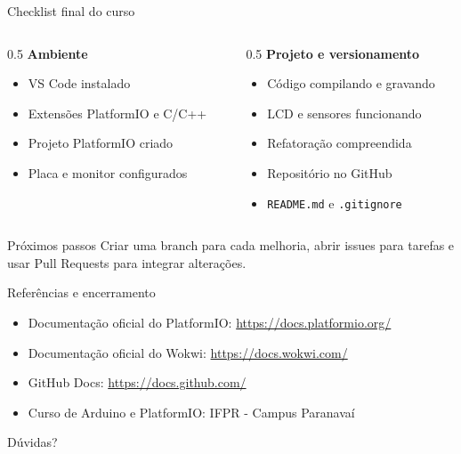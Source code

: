 \documentclass[aspectratio=169]{beamer}
\begin{document}
\begin{frame}{Checklist final do curso}
    \begin{columns}[T]
        \begin{column}{0.5\textwidth}
            \textbf{Ambiente}
            \begin{itemize}
                \item VS Code instalado
                \item Extensões PlatformIO e C/C++
                \item Projeto PlatformIO criado
                \item Placa e monitor configurados
            \end{itemize}
        \end{column}
        \begin{column}{0.5\textwidth}
            \textbf{Projeto e versionamento}
            \begin{itemize}
                \item Código compilando e gravando
                \item LCD e sensores funcionando
                \item Refatoração compreendida
                \item Repositório no GitHub
                \item \texttt{README.md} e \texttt{.gitignore}
            \end{itemize}
        \end{column}
    \end{columns}
    \vfill
    \begin{block}{Próximos passos}
        Criar uma branch para cada melhoria, abrir issues para tarefas e usar Pull Requests para integrar alterações.
    \end{block}
\end{frame}

\begin{frame}{Referências e encerramento}
    \vfill
    \begin{itemize}
        \item Documentação oficial do PlatformIO: \url{https://docs.platformio.org/}
        \item Documentação oficial do Wokwi: \url{https://docs.wokwi.com/}
        \item GitHub Docs: \url{https://docs.github.com/}
        \item Curso de Arduino e PlatformIO: IFPR - Campus Paranavaí
    \end{itemize}
    \vfill
    \centering
    \Large{Dúvidas?}
    \vfill
\end{frame}
\end{document}
